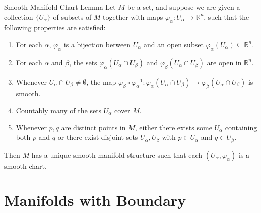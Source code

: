 \documentclass[../main.tex]{subfiles}
\begin{document}
\begin{lemma}{Smooth Manifold Chart Lemma}{}
Let $M$ be a set, and suppose we are given a collection $\{U_\alpha\}$ of subsets of $M$ together with maps $\varphi_\alpha : U_\alpha \to \mathbb{R}^n$, such that the following properties are satisfied:
\begin{enumerate}
    \item For each $\alpha$, $\varphi_\alpha$ is a bijection between $U_\alpha$ and an open subset $\varphi_\alpha(U_\alpha) \subseteq \mathbb{R}^n$.
    \item For each $\alpha$ and $\beta$, the sets $\varphi_\alpha(U_\alpha \cap U_\beta)$ and $\varphi_\beta(U_\alpha \cap U_\beta)$ are open in $\mathbb{R}^n$.
    \item Whenever $U_\alpha \cap U_\beta \neq \emptyset$, the map $\varphi_\beta \circ \varphi_\alpha^{-1} : \varphi_\alpha(U_\alpha \cap U_\beta) \to \varphi_\beta(U_\alpha \cap U_\beta)$ is smooth.
    \item Countably many of the sets $U_\alpha$ cover $M$.
    \item Whenever $p, q$ are distinct points in $M$, either there exists some $U_\alpha$ containing both $p$ and $q$ or there exist disjoint sets $U_\alpha, U_\beta$ with $p \in U_\alpha$ and $q \in U_\beta$.
\end{enumerate}
Then $M$ has a unique smooth manifold structure such that each $(U_\alpha, \varphi_\alpha)$ is a smooth chart.
\end{lemma}




\section{Manifolds with Boundary}
\end{document}
